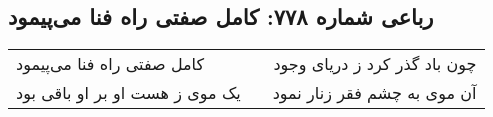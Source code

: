 \begin{center}
\section*{رباعی شماره ۷۷۸: کامل صفتی راه فنا می‌پیمود}
\label{sec:0778}
\begin{longtable}{l p{0.5cm} r}
کامل صفتی راه فنا می‌پیمود
&&
چون باد گذر کرد ز دریای وجود
\\
یک موی ز هست او بر او باقی بود
&&
آن موی به چشم فقر زنار نمود
\\
\end{longtable}
\end{center}
